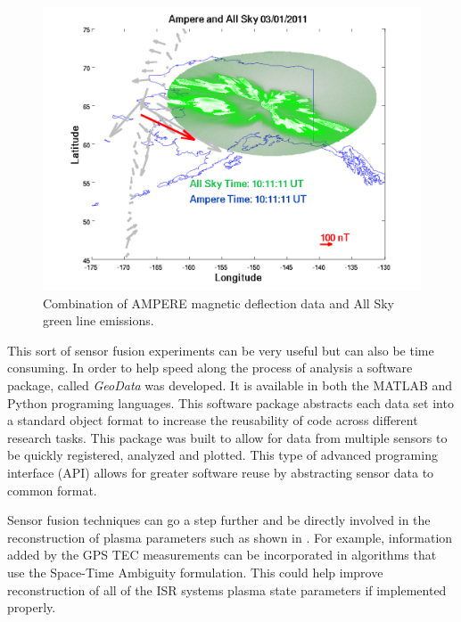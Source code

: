 \begin{figure}[h!]
\centering
\includegraphics[width=6.0in]{ampandallsky214}
\caption{Combination of AMPERE magnetic deflection data and All Sky green line emissions. }
\label{fig:swflow}
\end{figure}

This sort of sensor fusion experiments can be very useful but can also be time consuming. In order to help speed along the process of analysis a software package, called \textit{GeoData} was developed. It is available in both the MATLAB \cite{john_swoboda_2016_154536} 
and Python \cite{john_swoboda_2016_154533} programing languages. This software package abstracts each data set into a standard object format to increase the reusability of code across different research tasks. This package was built to allow for data from multiple sensors to be quickly registered, analyzed and plotted. This type of advanced programing interface (API) allows for greater software reuse by abstracting sensor data to common format.

Sensor fusion techniques can go a step further and be directly involved in the reconstruction of plasma parameters such as shown in \cite{Semeter:2016gm}. For example, information added by the GPS TEC measurements can be incorporated in algorithms that use the Space-Time Ambiguity formulation. This could help improve reconstruction of all of the ISR systems plasma state parameters if implemented properly.
